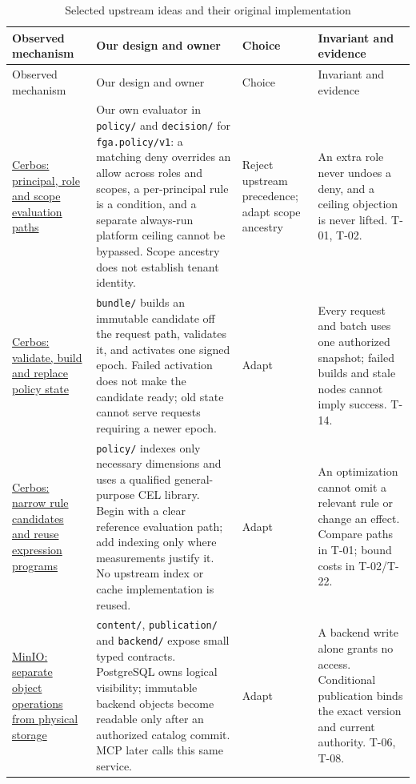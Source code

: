 \documentclass[11pt,a4paper]{article}
\newcommand{\code}[1]{{\small\nolinkurl{#1}}}
\begin{document}
\begin{longtable}{@{}P{0.21\textwidth}P{0.39\textwidth}P{0.10\textwidth}P{0.20\textwidth}@{}}
\caption{Selected upstream ideas and their original implementation}\label{tab:mechanisms}\\
\toprule Observed mechanism & Our design and owner & Choice & Invariant and evidence\\\midrule\endfirsthead
\toprule Observed mechanism & Our design and owner & Choice & Invariant and evidence\\\midrule\endhead
\href{https://github.com/cerbos/cerbos/blob/ae014ba2ea919771216bc666c4f654d18a1c1a52/internal/ruletable/check.go#L429}{Cerbos: principal, role and scope evaluation paths} & Our own evaluator in \code{policy/} and \code{decision/} for \code{fga.policy/v1}: a matching deny overrides an allow across roles and scopes, a per-principal rule is a condition, and a separate always-run platform ceiling cannot be bypassed. Scope ancestry does not establish tenant identity. & Reject upstream precedence; adapt scope ancestry & An extra role never undoes a deny, and a ceiling objection is never lifted. T-01, T-02.\\
\href{https://github.com/cerbos/cerbos/blob/ae014ba2ea919771216bc666c4f654d18a1c1a52/internal/ruletable/manager.go#L105}{Cerbos: validate, build and replace policy state} & \code{bundle/} builds an immutable candidate off the request path, validates it, and activates one signed epoch. Failed activation does not make the candidate ready; old state cannot serve requests requiring a newer epoch. & Adapt & Every request and batch uses one authorized snapshot; failed builds and stale nodes cannot imply success. T-14.\\
\href{https://github.com/cerbos/cerbos/blob/ae014ba2ea919771216bc666c4f654d18a1c1a52/internal/ruletable/index/index.go#L56}{Cerbos: narrow rule candidates and reuse expression programs} & \code{policy/} indexes only necessary dimensions and uses a qualified general-purpose CEL library. Begin with a clear reference evaluation path; add indexing only where measurements justify it. No upstream index or cache implementation is reused. & Adapt & An optimization cannot omit a relevant rule or change an effect. Compare paths in T-01; bound costs in T-02/T-22.\\
\href{https://github.com/minio/minio/blob/7aac2a2c5b7c882e68c1ce017d8256be2feea27f/cmd/object-api-interface.go#L246}{MinIO: separate object operations from physical storage} & \code{content/}, \code{publication/} and \code{backend/} expose small typed contracts. PostgreSQL owns logical visibility; immutable backend objects become readable only after an authorized catalog commit. MCP later calls this same service. & Adapt & A backend write alone grants no access. Conditional publication binds the exact version and current authority. T-06, T-08.\\

\end{longtable}
\end{document}

